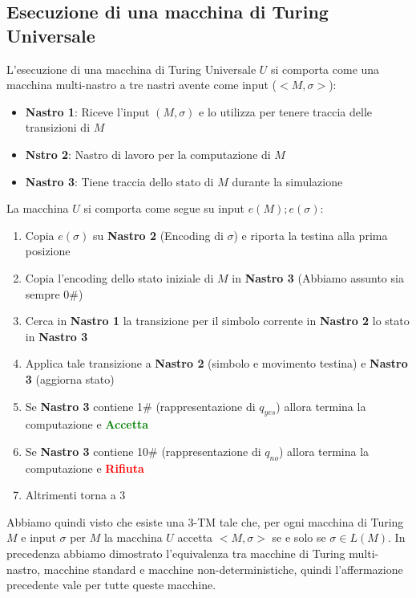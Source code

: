 \subsection{Esecuzione di una macchina di Turing Universale}
L'esecuzione di una macchina di Turing Universale $U$ si comporta come una macchina multi-nastro a tre nastri avente come input ($<M,\sigma>$):
\begin{itemize}
    \item \textbf{Nastro 1}: Riceve l'input $(M,\sigma)$ e lo utilizza per tenere traccia delle transizioni di $M$
    \item \textbf{Nstro 2}: Nastro di lavoro per la computazione di $M$
    \item \textbf{Nastro 3}: Tiene traccia dello stato di $M$ durante la simulazione 
\end{itemize} 
La macchina $U$ si comporta come segue su input $e(M);e(\sigma)$:
\begin{enumerate}
    \item Copia $e(\sigma)$ su \textbf{Nastro 2} (Encoding di $\sigma$) e riporta la testina alla prima posizione
    \item Copia l'encoding dello stato iniziale di $M$ in \textbf{Nastro 3} (Abbiamo assunto sia sempre 0\#)
    \item Cerca in \textbf{Nastro 1} la transizione per il simbolo corrente in \textbf{Nastro 2} lo stato in \textbf{Nastro 3}
    \item Applica tale transizione a \textbf{Nastro 2} (simbolo e movimento testina) e \textbf{Nastro 3} (aggiorna stato)
    \item Se \textbf{Nastro 3} contiene 1\# (rappresentazione di $q_{yes}$) allora termina la computazione e \textcolor{green}{\textbf{Accetta}}
    \item Se \textbf{Nastro 3} contiene 10\# (rappresentazione di $q_{no}$) allora termina la computazione e \textcolor{red}{\textbf{Rifiuta}}
    \item Altrimenti torna a 3
\end{enumerate}
Abbiamo quindi visto che esiste una 3-TM tale che, per ogni macchina di Turing $M$ e input $\sigma$ per $M$ la macchina $U$ accetta $<M,\sigma>$ se e solo se $\sigma \in L(M)$. 
In precedenza abbiamo dimostrato l'equivalenza tra macchine di Turing multi-nastro, macchine standard e macchine non-deterministiche, quindi l'affermazione precedente vale per tutte queste macchine.






